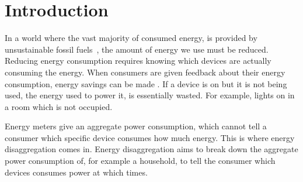 
\chapter{Introduction}
\label{chp:introduction}

\vspace{1\baselineskip}

\noindent


In a world where the vast majority of consumed energy, is provided by unsustainable fossil fuels~\cite{kolter2011redd}, the amount of energy we use must be reduced.
Reducing energy consumption requires knowing which devices are actually consuming the energy.
When consumers are given feedback about their energy consumption, energy savings can be made \cite{darby2006effectiveness}. %
If a device is on but it is not being used, the energy used to power it, is essentially wasted.
For example, lights on in a room which is not occupied.



Energy meters give an aggregate power consumption, which cannot tell a consumer which specific device consumes how much energy.
This is where energy disaggregation comes in.
Energy disaggregation aims to break down the aggregate power consumption of, for example a household, to tell the consumer which devices consumes power at which times.




